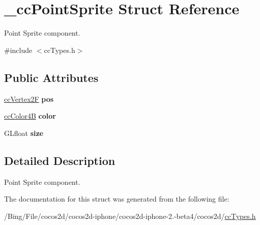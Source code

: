 \hypertarget{struct__cc_point_sprite}{\section{\-\_\-cc\-Point\-Sprite Struct Reference}
\label{struct__cc_point_sprite}
}


Point Sprite component.  




{\ttfamily \#include $<$cc\-Types.\-h$>$}

\subsection*{Public Attributes}
\begin{DoxyCompactItemize}
\item 
\hypertarget{struct__cc_point_sprite_ab9897fa2d8fbb855df344e84cadf17a5}{\hyperlink{cc_types_8h_a3d0a9a02a1f9787a9ede91b9a74bf41f}{cc\-Vertex2\-F} {\bfseries pos}}\label{struct__cc_point_sprite_ab9897fa2d8fbb855df344e84cadf17a5}

\item 
\hypertarget{struct__cc_point_sprite_a634cf0c9e0dd931152d463397de1b08d}{\hyperlink{cc_types_8h_a2f83e39e0378b79d089014c140169793}{cc\-Color4\-B} {\bfseries color}}\label{struct__cc_point_sprite_a634cf0c9e0dd931152d463397de1b08d}

\item 
\hypertarget{struct__cc_point_sprite_aa339a2a7ddbfacde8deb0e0ffd719f30}{G\-Lfloat {\bfseries size}}\label{struct__cc_point_sprite_aa339a2a7ddbfacde8deb0e0ffd719f30}

\end{DoxyCompactItemize}


\subsection{Detailed Description}
Point Sprite component. 

The documentation for this struct was generated from the following file\-:\begin{DoxyCompactItemize}
\item 
/\-Bing/\-File/cocos2d/cocos2d-\/iphone/cocos2d-\/iphone-\/2.-\/beta4/cocos2d/\hyperlink{cc_types_8h}{cc\-Types.\-h}\end{DoxyCompactItemize}
